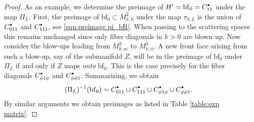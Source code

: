 \documentclass[JEP,XML,SOM,Unicode,NoFloatCountersInSection,published]{cedram}
\newcommand{\bbullet}{{\scriptscriptstyle\bullet}}
\newcommand{\sbullet}{{\raisebox{1pt}{$\bbullet$}}}
\theoremstyle{plain}
\theoremstyle{definition}
\newcommand{\bb}{{\mathrm{b}}}
\newcommand{\bbf}{{\mathrm{bf}}}
\newcommand{\ssc}{{\mathrm{sc}}}
\begin{document}
\begin{proof}
As an example, we determine the preimage of $H'=\bbf_0 = C_{11}^\sbullet$ under the map $\Pi_L$. First, the preimage of $\bbf_0\subset M^2_{k,\bb}$ under the map $\pi_{b,L}$ is the union of $C_{011}^\sbullet$ and $C_{111}^\sbullet$, see \eqref{eqn:preimage pi_bR}.
When passing to the scattering spaces this remains unchanged since only fiber diagonals in $k>0$ are blown up.
Now consider the blow-ups leading from $M^3_{k,\ssc}$ to $M^3_{k,\phi}$.
A new front face arising from such a blow-up, say of the submanifold $Z$, will be in the preimage of $\bbf_0$ under $\Pi_L$ if and only if $Z$ maps \textit{onto} $\bbf_0$. This is the case precisely for the fiber diagonals $C_{\phi1\phi}^\sbullet$ and $C_{\phi\phi1}^\sbullet$. Summarizing, we obtain
\[
(\Pi_L)^{-1}(\bbf_0) = C_{011}^\sbullet \cup C_{111}^\sbullet \cup C_{\phi1\phi}^\sbullet \cup C_{\phi\phi1}^\sbullet.
\]
By similar arguments we obtain preimages as listed in Table \ref{table:exp matrix}.


\end{proof}
\end{document}

